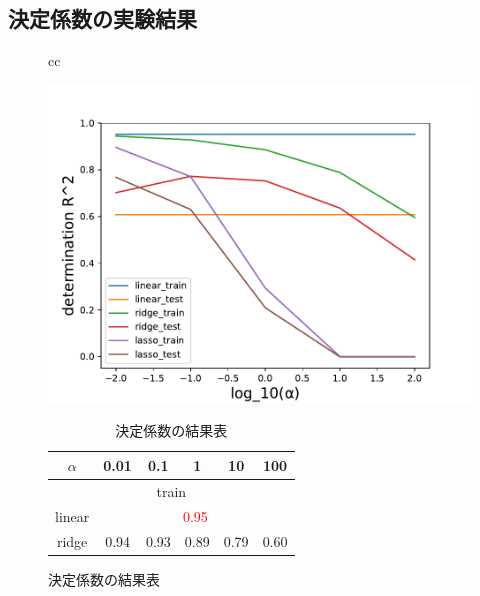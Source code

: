 \documentclass[dvipdfmx, 10pt]{beamer}
\begin{document}
\subsection{決定係数の実験結果}
    \begin{frame}{\insertsubsection}
       \begin{figure}[H]
        \begin{tabular}{cc}
    	 \begin{minipage}{0.4\hsize}
                    	\includegraphics[width=1.0\linewidth]{../img/score.pdf}
                    	\caption{決定係数の推移}
                   	\label{fig:score}
              \end{minipage}
    	 \begin{minipage}{0.6\hsize}
                	 \begin{table}[H]
                        	\centering
                        	\caption{決定係数の結果表}
                                	\begin{tabular}{|c|c|c|c|c|c|}
                        		\hline
                                		$\alpha$ & 0.01 & 0.1 & 1 & 10 & 100\\ 
                        		\hline
                        		\hline
                        		\multicolumn{6}{|c|}{train} \\
                        		\hline
                        		linear & \multicolumn{5}{|c|}{\textcolor{red}{0.95}} \\
                        		\hline
                        		ridge & 0.94 & 0.93 & 0.89 & 0.79 & 0.60 \\
                        		\hline

\end{tabular}
\end{table}
\end{minipage}
\end{tabular}
\end{figure}
\end{frame}
\end{document}
